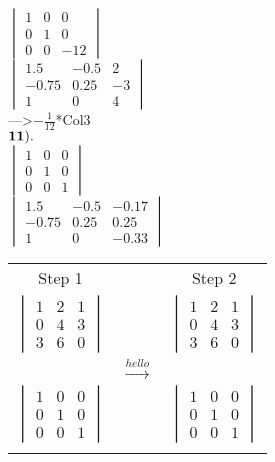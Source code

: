 \documentclass[]{article}
\begin{document}
\(\begin{vmatrix} 1 & 0 & 0\\ 0 & 1 & 0 \\ 0 & 0 & -12 \end{vmatrix}\)\\

\(\begin{vmatrix} 1.5 & -0.5 & 2\\ -0.75 & 0.25 & -3 \\ 1 & 0 & 4 \end{vmatrix}\)\\

---\textgreater{}\(-\frac{1}{12}\)*Col3\\
 \(\bold{11).}\)\\
 \(\begin{vmatrix} 1 & 0 & 0\\ 0 & 1 & 0 \\ 0 & 0 & 1 \end{vmatrix}\)\\

\(\begin{vmatrix} 1.5 & -0.5 & -0.17\\ -0.75 & 0.25 & 0.25 \\ 1 & 0 & -0.33 \end{vmatrix}\)\\

\begingroup

\begin{tabular}{ c c c }
Step 1 &  & Step 2 \\
$\begin{vmatrix} 1 & 2 & 1\\ 0 & 4 & 3 \\ 3 & 6 & 0 \end{vmatrix}$ &  & $\begin{vmatrix} 1 & 2 & 1\\ 0 & 4 & 3 \\ 3 & 6 & 0 \end{vmatrix}$\\
 & $\xrightarrow{hello}$ & \\
$\begin{vmatrix} 1 &   0 &   0\\ 0 &   1 &   0 \\ 0 &   0 &   1 \end{vmatrix}$ &  & $\begin{vmatrix} 1 &   0 &   0\\ 0 &   1 &   0 \\ 0 &   0 &   1 \end{vmatrix}$\\
 &  & \\
\end{tabular}

\endgroup
\end{document}
